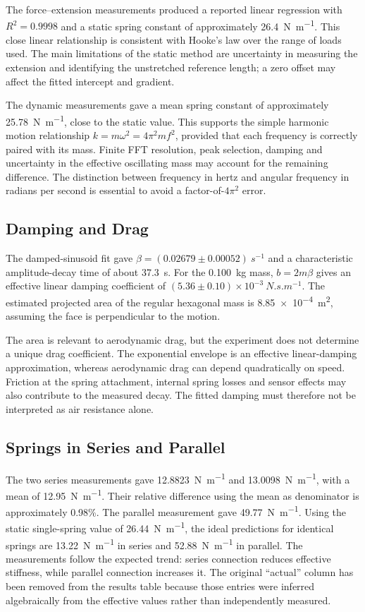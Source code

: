 \documentclass[12pt,a4paper]{article}
\begin{document}
The force--extension measurements produced a reported linear regression with $R^2=0.9998$ and a static spring constant of approximately \SI{26.4}{N.m^{-1}}. This close linear relationship is consistent with Hooke's law over the range of loads used. The main limitations of the static method are uncertainty in measuring the extension and identifying the unstretched reference length; a zero offset may affect the fitted intercept and gradient.

The dynamic measurements gave a mean spring constant of approximately \SI{25.78}{N.m^{-1}}, close to the static value. This supports the simple harmonic motion relationship $k=m\omega^2=4\pi^2mf^2$, provided that each frequency is correctly paired with its mass. Finite FFT resolution, peak selection, damping and uncertainty in the effective oscillating mass may account for the remaining difference. The distinction between frequency in hertz and angular frequency in radians per second is essential to avoid a factor-of-$4\pi^2$ error.

\subsection{Damping and Drag}

The damped-sinusoid fit gave $\beta=(0.02679\pm0.00052)\ \si{s^{-1}}$ and a characteristic amplitude-decay time of about \SI{37.3}{s}. For the \SI{0.100}{kg} mass, $b=2m\beta$ gives an effective linear damping coefficient of $(5.36\pm0.10)\times10^{-3}\ \si{N.s.m^{-1}}$. The estimated projected area of the regular hexagonal mass is \SI{8.85e-4}{m^2}, assuming the face is perpendicular to the motion.

The area is relevant to aerodynamic drag, but the experiment does not determine a unique drag coefficient. The exponential envelope is an effective linear-damping approximation, whereas aerodynamic drag can depend quadratically on speed. Friction at the spring attachment, internal spring losses and sensor effects may also contribute to the measured decay. The fitted damping must therefore not be interpreted as air resistance alone.

\subsection{Springs in Series and Parallel}

The two series measurements gave \SI{12.8823}{N.m^{-1}} and \SI{13.0098}{N.m^{-1}}, with a mean of \SI{12.95}{N.m^{-1}}. Their relative difference using the mean as denominator is approximately 0.98\%. The parallel measurement gave \SI{49.77}{N.m^{-1}}. Using the static single-spring value of \SI{26.44}{N.m^{-1}}, the ideal predictions for identical springs are \SI{13.22}{N.m^{-1}} in series and \SI{52.88}{N.m^{-1}} in parallel. The measurements follow the expected trend: series connection reduces effective stiffness, while parallel connection increases it. The original ``actual'' column has been removed from the results table because those entries were inferred algebraically from the effective values rather than independently measured.
\end{document}
